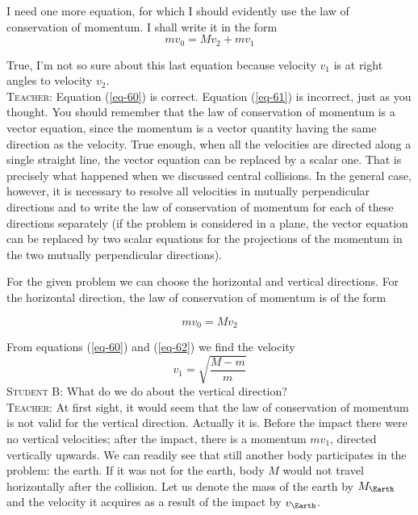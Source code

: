 \documentclass[a4paper,sfsidenotes]{tufte-book}
\begin{document}
I need one more equation, for which I should evidently use the law of conservation of momentum. I shall write it in the form 
\begin{equation} 
mv_{0} =Mv_{2} +  mv_{1} 
\label{eq-61}
\end{equation}

True, I'm not so sure about this last equation because velocity $v_{1} $ is at right angles to velocity $v_{2}$.
\\
\textsc{Teacher:} Equation (\ref{eq-60}) is correct. Equation (\ref{eq-61}) is incorrect, just as you thought. You should remember that the law of conservation of momentum is a vector equation, since the momentum is a vector quantity having the same direction as the velocity. True enough, when all the velocities are directed along a single straight line, the vector equation can be replaced by a scalar one. That is precisely what happened when we discussed central collisions. In the general case, however, it is
necessary to resolve all velocities in mutually perpendicular directions and to write the law of conservation of momentum for each of these directions separately (if the problem is considered in a plane, the vector equation can be replaced by two scalar equations for the projections of the momentum in the two mutually perpendicular directions).

For the given problem we can choose the horizontal and vertical directions. For the horizontal direction, the law of conservation of momentum is of the form

\begin{equation}
mv_{0}= Mv_{2}
\label{eq-62}
\end{equation}

From equations (\ref{eq-60}) and (\ref{eq-62}) we find the velocity
\begin{equation*}
v_{1} = \sqrt{\frac{M-m}{m}}
\end{equation*}
\textsc{Student B:} What do we do about the vertical direction?
\\
\textsc{Teacher:} At first sight, it would seem that the law of conservation of momentum is not valid for the vertical direction. Actually it is. Before the impact there were no vertical velocities; after the impact, there is a momentum $mv_{1}$, directed vertically upwards. We can readily see that still another body participates in the problem: the earth. If it was not for the earth, body $M$ would not travel horizontally
after the collision. Let us denote the mass of the earth by $M_{\Earth}$ and the velocity it acquires as a result of the impact by $v_{\Earth}$.
\end{document}
